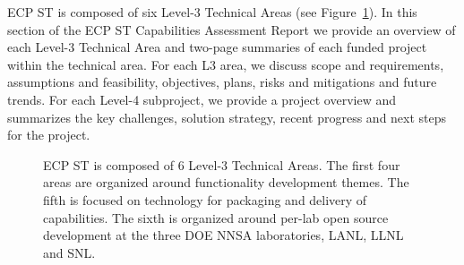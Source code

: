 \documentclass{ecpreport-publicv1}
\newcommand{\pmr}{Programming Models \& Runtimes}
\begin{document}
ECP ST is composed of six Level-3 Technical Areas (see Figure~\ref{fig:l3-overview}).  In this section of the ECP ST Capabilities Assessment Report we provide an overview of each Level-3 Technical Area and two-page summaries of each funded project within the technical area.  For each L3 area, we discuss scope and requirements, assumptions and feasibility, objectives, plans, risks and mitigations and future trends.  For each Level-4 subproject, we provide a project overview and summarizes the key challenges, solution strategy, recent progress and next steps for the project.
\
\begin{figure}
	\centering
	\caption{ECP ST is composed of 6 Level-3 Technical Areas.  The first four areas are organized around functionality development themes.  The fifth is focused on technology for packaging and delivery of capabilities.  The sixth is organized around per-lab open source development at the three DOE NNSA laboratories, LANL, LLNL and SNL.  }
	\label{fig:l3-overview}
\end{figure}

\newpage

\newpage

\newpage

\newpage

\newpage

\newpage


\newpage

\newpage

\newpage

\newpage

\newpage
\end{document}
